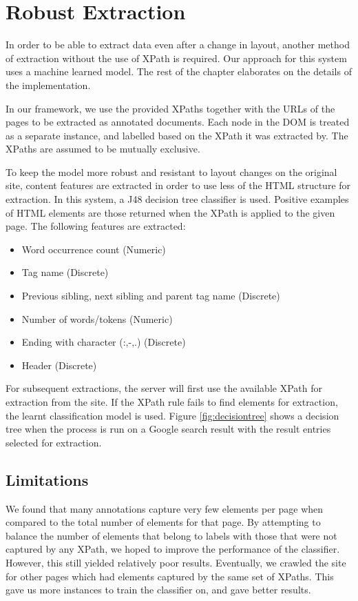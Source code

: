 \section{Robust Extraction}
\label{section:extraction}
In order to be able to extract data even after a change in layout, another method of extraction without the use of XPath is required. Our approach for this system uses a machine learned model. The rest of the chapter elaborates on the details of the implementation.

In our framework, we use the provided XPaths together with the URLs of the pages to be extracted as annotated documents. Each node in the DOM is treated as a separate instance, and labelled based on the XPath it was extracted by. The XPaths are assumed to be mutually exclusive.


To keep the model more robust and resistant to layout changes on the original site, content features are extracted in order to use less of the HTML structure for extraction. In this system, a J48 decision tree classifier is used. Positive examples of HTML elements are those returned when the XPath is applied to the given page. The following features are extracted:

	\begin{itemize}
		\item Word occurrence count (Numeric)
		\item Tag name (Discrete)
		\item Previous sibling, next sibling and parent tag name (Discrete)
		\item Number of words/tokens (Numeric)
		\item Ending with character (:,-,.) (Discrete)
		\item Header (Discrete)
	\end{itemize}
	
	For subsequent extractions, the server will first use the available XPath for extraction from the site. If the XPath rule fails to find elements for extraction, the learnt classification model is used. Figure \ref{fig:decisiontree} shows a decision tree when the process is run on a Google search result with the result entries selected for extraction.
	
\subsection{Limitations}
	We found that many annotations capture very few elements per page when compared to the total number of elements for that page. By attempting to balance the number of elements that belong to labels with those that were not captured by any XPath, we hoped to improve the performance of the classifier. However, this still yielded relatively poor results. Eventually, we crawled the site for other pages which had elements captured by the same set of XPaths. This gave us more instances to train the classifier on, and gave better results.
	

